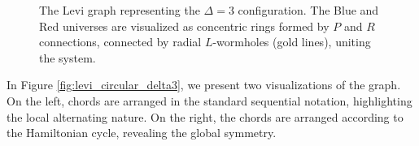 \documentclass[12pt,letterpaper]{amsart}
\begin{document}
\begin{figure}[H]
    \caption{The Levi graph representing the \texorpdfstring{$\Delta=3$}{Delta=3} configuration. The Blue and Red universes are visualized as concentric rings formed by \texorpdfstring{$P$}{P} and \texorpdfstring{$R$}{R} connections, connected by radial \texorpdfstring{$L$}{L}-wormholes (gold lines), uniting the system.}
    \label{fig:levi_concentric_delta3}
\end{figure}

In Figure \ref{fig:levi_circular_delta3}, we present two visualizations of the graph. On the left, chords are arranged in the standard sequential notation, highlighting the local alternating nature. On the right, the chords are arranged according to the Hamiltonian cycle, revealing the global symmetry.
\end{document}
